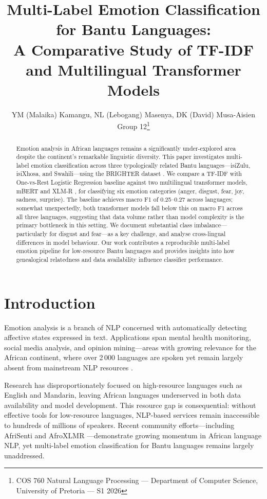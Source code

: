 \documentclass[11pt]{article}
\title{Multi-Label Emotion Classification for Bantu Languages:\\
A Comparative Study of TF-IDF and Multilingual Transformer Models}
\author{YM (Malaika) Kamangu, NL (Lebogang) Masenya, DK (David) Musa-Aisien \\
  Group 12\thanks{COS 760 Natural Language Processing --- Department of Computer Science, University of Pretoria --- S1 2026}}
\begin{document}
\maketitle

\begin{abstract}
Emotion analysis in African languages remains a significantly under-explored
area despite the continent's remarkable linguistic diversity.
This paper investigates multi-label emotion classification across three
typologically related Bantu languages---isiZulu, isiXhosa, and Swahili---using
the BRIGHTER dataset \citep{abdulmumin2024brighter}.
We compare a TF-IDF with One-vs-Rest Logistic Regression baseline against
two multilingual transformer models, mBERT \citep{devlin2019bert} and
XLM-R \citep{conneau2020unsupervised}, for classifying six emotion categories
(anger, disgust, fear, joy, sadness, surprise).
The baseline achieves macro F1 of 0.25--0.27 across languages; somewhat
unexpectedly, both transformer models fall below this on macro F1 across all
three languages, suggesting that data volume rather than model complexity is
the primary bottleneck in this setting.
We document substantial class imbalance---particularly for disgust and fear---as
a key challenge, and analyse cross-lingual differences in model behaviour.
Our work contributes a reproducible multi-label emotion pipeline for low-resource
Bantu languages and provides insights into how genealogical relatedness
and data availability influence classifier performance.
\end{abstract}

\section{Introduction}

Emotion analysis is a branch of NLP concerned with automatically detecting
affective states expressed in text.
Applications span mental health monitoring, social media analysis, and
opinion mining---areas with growing relevance for the African continent,
where over 2\,000 languages are spoken yet remain largely absent from mainstream
NLP resources \citep{adelani2022masakhaner}.

Research has disproportionately focused on high-resource languages such as
English and Mandarin, leaving African languages underserved in both data
availability and model development.
This resource gap is consequential: without effective tools for low-resource
languages, NLP-based services remain inaccessible to hundreds of millions of
speakers.
Recent community efforts---including AfriSenti \citep{muhammad2023afrisenti}
and AfroXLMR \citep{alabi2022adapting}---demonstrate growing momentum in
African language NLP, yet multi-label emotion classification for Bantu
languages remains largely unaddressed.
\end{document}
